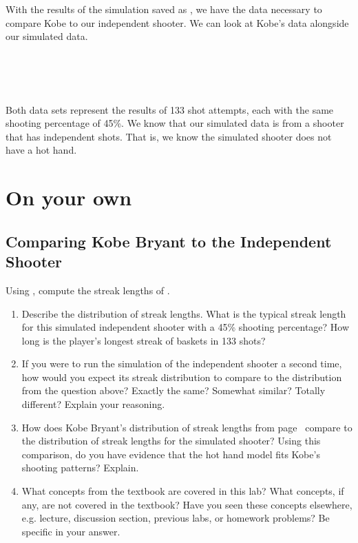 \documentclass[11pt]{article}
\begin{document}
With the results of the simulation saved as \texttt{}, we have the data necessary to compare Kobe to our independent shooter.  We can look at Kobe's data alongside our simulated data.

\ttfamily\noindent
\hlstd{}\hspace*{\fill}\\
\hlstd{}\hlkeyword{\usebox{\hlnormalsizeboxdollar}}\hspace*{\fill}\\
\hlstd{}\hspace*{\fill}\\
\normalfont

Both data sets represent the results of 133 shot attempts, each with the same shooting percentage of 45\%.  We know that our simulated data is from a shooter that has independent shots. That is, we know the simulated shooter does not have a hot hand.

\pagebreak

%

\section*{On your own}
\subsection*{Comparing Kobe Bryant to the Independent Shooter}
Using \texttt{}, compute the streak lengths of \texttt{}.

\begin{enumerate}
\item Describe the distribution of streak lengths.  What is the typical streak length for this simulated independent shooter with a 45\% shooting percentage?  How long is the player's longest streak of baskets in 133 shots?

\item If you were to run the simulation of the independent shooter a second time, how would you expect its streak distribution to compare to the distribution from the question above?  Exactly the same?  Somewhat similar?  Totally different?  Explain your reasoning.

\item How does Kobe Bryant's distribution of streak lengths from page~\pageref{kobeStreak} compare to the distribution of streak lengths for the simulated shooter?  Using this comparison, do you have evidence that the hot hand model fits Kobe's shooting patterns? Explain.

\item What concepts from the textbook are covered in this lab?  What concepts, if any, are not covered in the textbook?  Have you seen these concepts elsewhere, e.g. lecture, discussion section, previous labs, or homework problems?  Be specific in your answer.
\end{enumerate}
\end{document}
